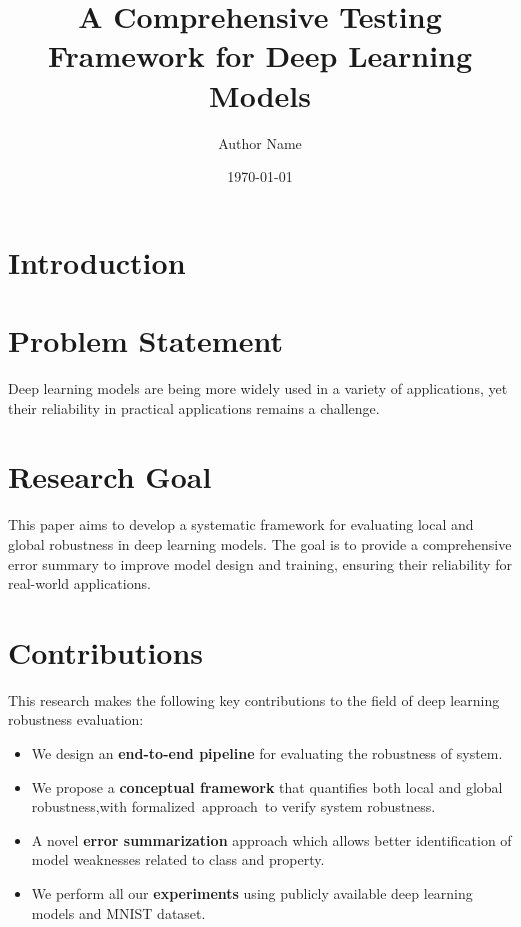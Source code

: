 \documentclass[10pt, conference, a4paper, final]{IEEEtran}
\title{A Comprehensive Testing Framework for Deep Learning Models}
\author{Author Name}
\date{\today}
\begin{document}
\maketitle

\begin{abstract}
\end{abstract}


\section{Introduction}

\section{Problem Statement}

Deep learning models are being more widely used in a variety of applications, yet their reliability in practical applications remains a challenge.


\section{Research Goal}
This paper aims to develop a systematic framework for evaluating local and global robustness in deep learning models. 
The goal is to provide a comprehensive error summary to improve model design and training, ensuring their reliability for real-world applications.

\section{Contributions}
This research makes the following key contributions to the field of deep learning robustness evaluation:
\begin{itemize}
   
    \item We design an \textbf{end-to-end pipeline} for evaluating the robustness of system.
    
    \item We propose a \textbf{conceptual framework} that quantifies both local and global robustness,with formalized approach to verify system robustness.
    \item A novel \textbf{error summarization}  approach which allows better identification of model weaknesses related to class and property.

    \item We perform all our \textbf{experiments} using publicly available deep learning models and MNIST dataset.
\end{itemize}
\end{document}
